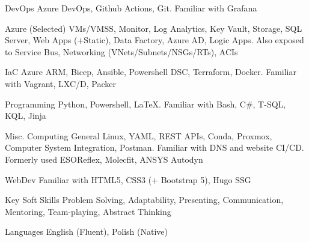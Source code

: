 

\begin{cvskills}

  \cvskill
    {DevOps} 
    {Azure DevOps, Github Actions, Git. Familiar with Grafana} 


  \cvskill
    {Azure (Selected)} 
    {VMs/VMSS, Monitor, Log Analytics, Key Vault, Storage, SQL Server, Web Apps (+Static), Data Factory, Azure AD, Logic Apps. Also exposed to Service Bus, Networking (VNets/Subnets/NSGs/RTs), ACIs}

  \cvskill
    {IaC} 
    {Azure ARM, Bicep, Ansible, Powershell DSC, Terraform, Docker. Familiar with Vagrant, LXC/D, Packer} 

  \cvskill
    {Programming} 
    {Python, Powershell, \LaTeX. Familiar with Bash, C\#, T-SQL, KQL, Jinja}
    
  \cvskill
    {Misc. Computing} 
    {General Linux, YAML, REST APIs, Conda, Proxmox, Computer System Integration, Postman. Familiar with DNS and website CI/CD. Formerly used ESOReflex, Molecfit, ANSYS Autodyn} 

  \cvskill
    {WebDev} 
    {Familiar with HTML5, CSS3 (+ Bootstrap 5), Hugo SSG} 

  \cvskill
    {Key Soft Skills} 
    {Problem Solving, Adaptability, Presenting, Communication, Mentoring, Team-playing, Abstract Thinking} 

  \cvskill
    {Languages} 
    {English (Fluent), Polish (Native)} 
    
\end{cvskills}
